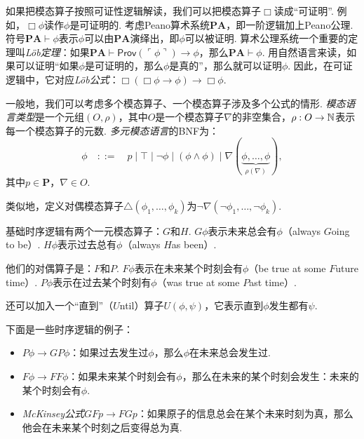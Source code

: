 \newcommand{\PA}{\mathbf{PA}}

\begin{example}[可证性语义]
如果把模态算子按照可证性逻辑解读，我们可以把模态算子$\Box$读成“可证明”. 例如，$\Box\phi$读作$\phi$是可证明的. 考虑Peano算术系统$\PA$，即一阶逻辑加上Peano公理. 符号$\PA\vdash \phi$表示$\phi$可以由$\PA$演绎出，即$\phi$可以被证明. 算术公理系统一个重要的定理叫\emph{Löb定理}：如果$\PA\vdash\mathsf{Prov}(\ulcorner\phi\urcorner)\to\phi$，那么$\PA\vdash\phi$. 用自然语言来读，如果可以证明“如果$\phi$是可证明的，那么$\phi$是真的”，那么就可以证明$\phi$. 因此，在可证逻辑中，它对应\emph{Löb公式}：$\Box(\Box\phi\to\phi)\to\Box\phi$. 
\end{example}

 一般地，我们可以考虑多个模态算子、一个模态算子涉及多个公式的情形. \emph{模态语言类型}是一个元组$(O,\rho)$，其中$O$是一个模态算子$\nabla$的非空集合，$\rho:O\to\mathbb{N}$表示每一个模态算子的元数. \emph{多元模态语言}的BNF为：
    \[\phi\quad::=\quad p\mid \top\mid \neg\phi\mid (\phi\wedge\phi)\mid \nabla(\underbrace{\phi,\dots,\phi}_{\rho(\nabla)}),\]
    其中$p\in \mathbf P$，$\nabla\in O$.

类似地，定义对偶模态算子$\triangle(\phi_1,\dots,\phi_k)$为$\neg\nabla(\neg\phi_1,\dots,\neg\phi_k)$.


\begin{example}[时序逻辑]
基础时序逻辑有两个一元模态算子：$G$和$H$. $G\phi$表示未来总会有$\phi$（always $G$oing to be）. $H\phi$表示过去总有$\phi$（always $H$as been）.

他们的对偶算子是：$F$和$P$. $F\phi$表示在未来某个时刻会有$\phi$（be true at some $F$uture time）. $P\phi$表示在过去某个时刻有$\phi$（was true at some $P$ast time）.

还可以加入一个“直到”（$U$ntil）算子$U(\phi,\psi)$，它表示直到$\phi$发生都有$\psi$.

下面是一些时序逻辑的例子：
\begin{itemize}
    \item $P\phi\to GP\phi$：如果过去发生过$\phi$，那么$\phi$在未来总会发生过.
    \item $F\phi\to FF\phi$：如果未来某个时刻会有$\phi$，那么在未来的某个时刻会发生：未来的某个时刻会有$\phi$.
    \item \emph{McKinsey公式}$GF p\to FG p$：如果原子的信息总会在某个未来时刻为真，那么他会在未来某个时刻之后变得总为真.
\end{itemize}
\end{example}


